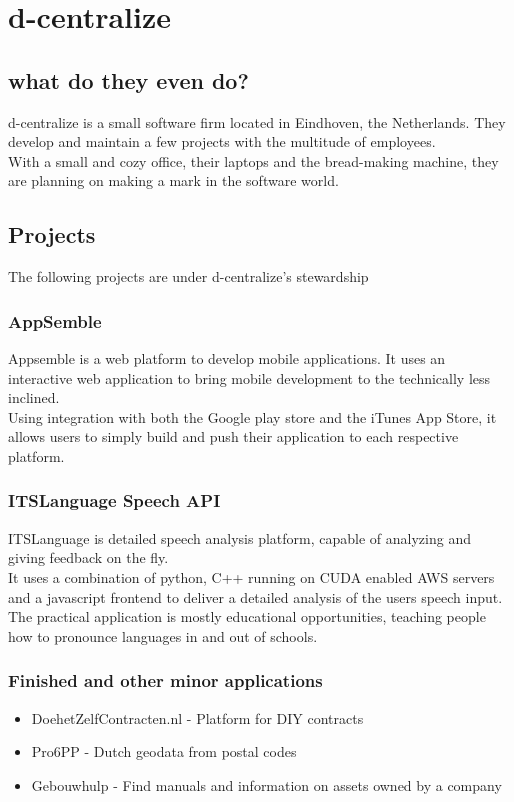 \chapter{d-centralize}
\section{what do they even do?}
d-centralize is a small software firm located in Eindhoven, the Netherlands. They develop and maintain a few projects with the multitude of employees. \\

With a small and cozy office, their laptops and the bread-making machine, they are planning on making a mark in the software world.

\section{Projects}

The following projects are under d-centralize's stewardship

\subsection{AppSemble}
Appsemble is a web platform to develop mobile applications. It uses an interactive web application to bring mobile development to the technically less inclined. \cite{dcent1} \\

Using integration with both the Google play store and the iTunes App Store, it allows users to simply build and push their application to each respective platform.

\subsection{ITSLanguage Speech API}
ITSLanguage is detailed speech analysis platform, capable of analyzing and giving feedback on the fly. \\

It uses a combination of python, C++ running on CUDA enabled AWS servers and a javascript frontend to deliver a detailed analysis of the users speech input. \\

The practical application is mostly educational opportunities, teaching people how to pronounce languages in and out of schools.

\subsection{Finished and other minor applications}

\begin{itemize}
	\item DoehetZelfContracten.nl - Platform for DIY contracts
	\item Pro6PP - Dutch geodata from postal codes
	\item Gebouwhulp - Find manuals and information on assets owned by a company
\end{itemize}